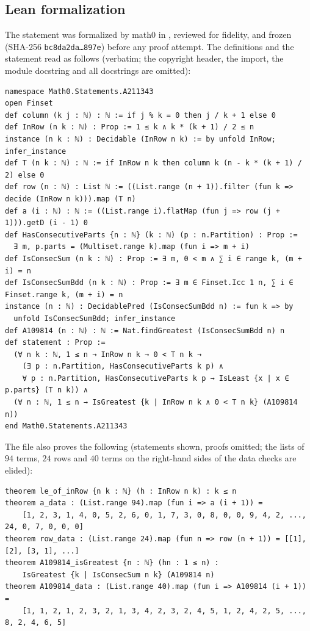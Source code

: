 \documentclass[11pt]{amsart}
\theoremstyle{plain}
\theoremstyle{definition}
\begin{document}
\subsection*{Lean formalization}
The statement was formalized by math0 in , reviewed for fidelity, and frozen (SHA-256 \texttt{bc8da2da\ldots 897e}) before any proof attempt. The definitions and the statement read as follows (verbatim; the copyright header, the import, the module docstring and all docstrings are omitted):
\begin{lstlisting}
namespace Math0.Statements.A211343
open Finset
def column (k j : ℕ) : ℕ := if j % k = 0 then j / k + 1 else 0
def InRow (n k : ℕ) : Prop := 1 ≤ k ∧ k * (k + 1) / 2 ≤ n
instance (n k : ℕ) : Decidable (InRow n k) := by unfold InRow; infer_instance
def T (n k : ℕ) : ℕ := if InRow n k then column k (n - k * (k + 1) / 2) else 0
def row (n : ℕ) : List ℕ := ((List.range (n + 1)).filter (fun k => decide (InRow n k))).map (T n)
def a (i : ℕ) : ℕ := ((List.range i).flatMap (fun j => row (j + 1))).getD (i - 1) 0
def HasConsecutiveParts {n : ℕ} (k : ℕ) (p : n.Partition) : Prop :=
  ∃ m, p.parts = (Multiset.range k).map (fun i => m + i)
def IsConsecSum (n k : ℕ) : Prop := ∃ m, 0 < m ∧ ∑ i ∈ range k, (m + i) = n
def IsConsecSumBdd (n k : ℕ) : Prop := ∃ m ∈ Finset.Icc 1 n, ∑ i ∈ Finset.range k, (m + i) = n
instance (n : ℕ) : DecidablePred (IsConsecSumBdd n) := fun k => by
  unfold IsConsecSumBdd; infer_instance
def A109814 (n : ℕ) : ℕ := Nat.findGreatest (IsConsecSumBdd n) n
def statement : Prop :=
  (∀ n k : ℕ, 1 ≤ n → InRow n k → 0 < T n k →
    (∃ p : n.Partition, HasConsecutiveParts k p) ∧
    ∀ p : n.Partition, HasConsecutiveParts k p → IsLeast {x | x ∈ p.parts} (T n k)) ∧
  (∀ n : ℕ, 1 ≤ n → IsGreatest {k | InRow n k ∧ 0 < T n k} (A109814 n))
end Math0.Statements.A211343
\end{lstlisting}
The file also proves the following (statements shown, proofs omitted; the lists of $94$ terms, $24$ rows and $40$ terms on the right-hand sides of the data checks are elided):
\begin{lstlisting}
theorem le_of_inRow {n k : ℕ} (h : InRow n k) : k ≤ n
theorem a_data : (List.range 94).map (fun i => a (i + 1)) =
    [1, 2, 3, 1, 4, 0, 5, 2, 6, 0, 1, 7, 3, 0, 8, 0, 0, 9, 4, 2, ..., 24, 0, 7, 0, 0, 0]
theorem row_data : (List.range 24).map (fun n => row (n + 1)) = [[1], [2], [3, 1], ...]
theorem A109814_isGreatest {n : ℕ} (hn : 1 ≤ n) :
    IsGreatest {k | IsConsecSum n k} (A109814 n)
theorem A109814_data : (List.range 40).map (fun i => A109814 (i + 1)) =
    [1, 1, 2, 1, 2, 3, 2, 1, 3, 4, 2, 3, 2, 4, 5, 1, 2, 4, 2, 5, ..., 8, 2, 4, 6, 5]
\end{lstlisting}
\end{document}
